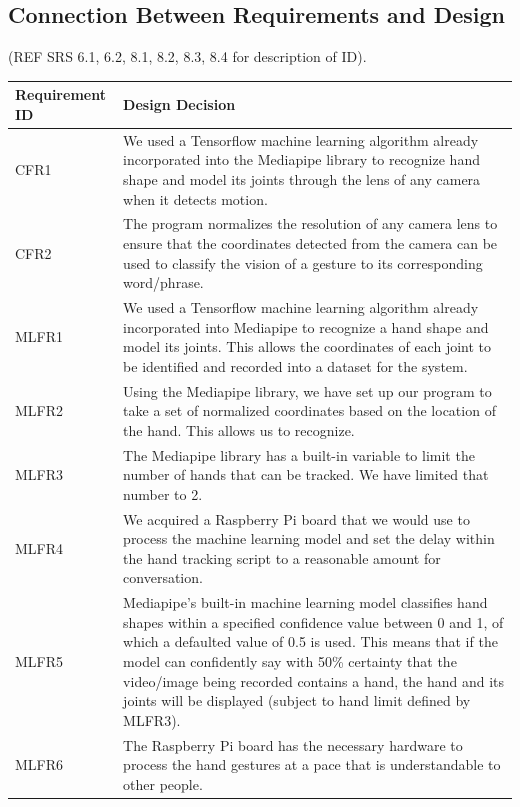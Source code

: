 \documentclass[12pt, titlepage]{article}
\begin{document}
\subsection{Connection Between Requirements and Design} \label{SecConnection}
(REF SRS 6.1, 6.2, 8.1, 8.2, 8.3, 8.4 for description of ID).

\renewcommand{\arraystretch}{1.2}
\noindent \begin{longtable}{p{}|p{}}
\hline
\textbf{Requirement ID} & \textbf{Design Decision}\\
\hline
CFR1
& We used a Tensorflow machine learning algorithm already incorporated into the Mediapipe library to recognize hand shape and model its joints through the lens of any camera when it detects motion.\\
\hline
CFR2
& The program normalizes the resolution of any camera lens to ensure that the coordinates detected from the camera can be used to classify the vision of a gesture to its corresponding word/phrase.\\
\hline
MLFR1
& We used a Tensorflow machine learning algorithm already incorporated into Mediapipe to recognize a hand shape and model its joints. This allows the coordinates of each joint to be identified and recorded into a dataset for the system.\\
\hline
MLFR2
& Using the Mediapipe library, we have set up our program to take a set of normalized coordinates based on the location of the hand. This allows us to recognize.\\
\hline
MLFR3
& The Mediapipe library has a built-in variable to limit the number of hands that can be tracked. We have limited that number to 2.\\
\hline
MLFR4
& We acquired a Raspberry Pi board that we would use to process the machine learning model and set the delay within the hand tracking script to a reasonable amount for conversation.\\
\hline
MLFR5
& Mediapipe’s built-in machine learning model classifies hand shapes within a specified confidence value between 0 and 1, of which a defaulted value of 0.5 is used. This means that if the model can confidently say with 50\% certainty that the video/image being recorded contains a hand, the hand and its joints will be displayed (subject to hand limit defined by MLFR3).\\
\hline
MLFR6
& The Raspberry Pi board has the necessary hardware to process the hand gestures at a pace that is understandable to other people.\\

\end{longtable}
\end{document}
